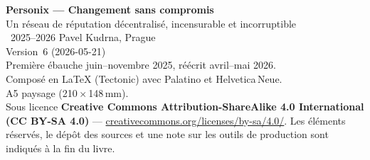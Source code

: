 \thispagestyle{empty}
\ifdefined\printmode\vspace*{\fill}\else{}\fi
\begin{flushleft}\small\sffamily
\textbf{Personix --- Changement sans compromis}\\[0.3em]
Un réseau de réputation décentralisé, incensurable et incorruptible\\[1.4em]

\textcopyright\ 2025--2026 Pavel Kudrna, Prague\\[0.4em]

Version~6 (2026-05-21)\\
Première ébauche juin--novembre 2025, réécrit avril--mai 2026.\\[1.4em]

Composé en \LaTeX{} (Tectonic) avec Palatino et Helvetica\,Neue.\\
A5 paysage (210\,$\times$\,148\,mm).\\[1.4em]

Sous licence \textbf{Creative Commons Attribution-ShareAlike 4.0
International (CC BY-SA 4.0)} ---
\href{https://creativecommons.org/licenses/by-sa/4.0/}{creativecommons.org/licenses/by-sa/4.0/}.
Les éléments réservés, le dépôt des sources et une note sur les outils
de production sont indiqués à la fin du livre.
\end{flushleft}
\ifdefined\printmode\else{}\fi
\clearpage
